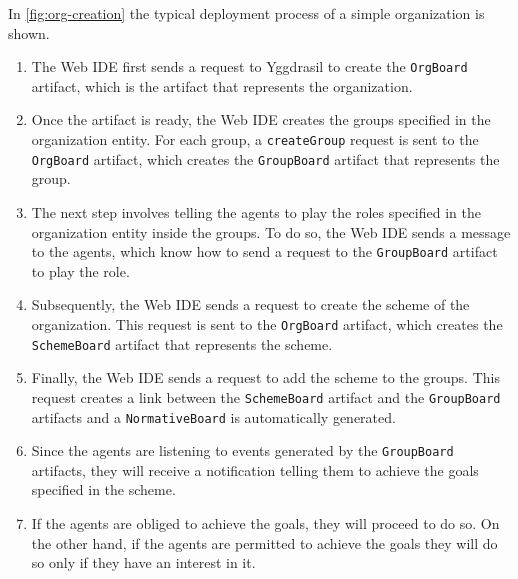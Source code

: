 In \cref{fig:org-creation} the typical deployment process of a simple organization is shown.
\begin{enumerate}
    \item The Web IDE first sends a request to Yggdrasil to create the \texttt{OrgBoard} artifact, which is the artifact that represents the organization.
    \item Once the artifact is ready, the Web IDE creates the groups specified in the organization entity.
    For each group, a \texttt{createGroup} request is sent to the \texttt{OrgBoard} artifact, which creates the \texttt{GroupBoard} artifact that represents the group.
    \item The next step involves telling the agents to play the roles specified in the organization entity inside the groups.
    To do so, the Web IDE sends a message to the agents, which know how to send a request to the \texttt{GroupBoard} artifact to play the role.
    \item Subsequently, the Web IDE sends a request to create the scheme of the organization.
    This request is sent to the \texttt{OrgBoard} artifact, which creates the \texttt{SchemeBoard} artifact that represents the scheme.
    \item Finally, the Web IDE sends a request to add the scheme to the groups.
    This request creates a link between the \texttt{SchemeBoard} artifact and the \texttt{GroupBoard} artifacts and a \texttt{NormativeBoard} is automatically generated.
    \item Since the agents are listening to events generated by the \texttt{GroupBoard} artifacts, they will receive a notification telling them to achieve the goals specified in the scheme.
    \item If the agents are obliged to achieve the goals, they will proceed to do so.
    On the other hand, if the agents are permitted to achieve the goals they will do so only if they have an interest in it.
\end{enumerate}
